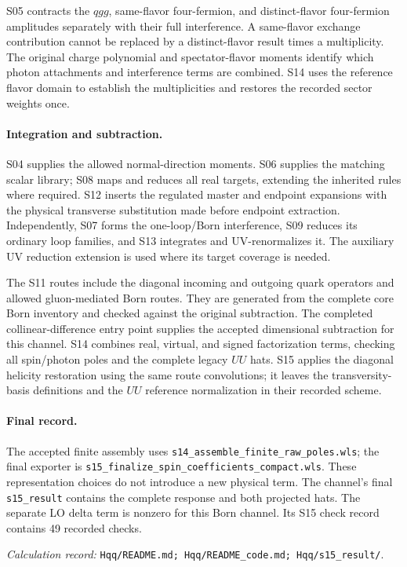 \documentclass[11pt,a4paper]{article}
\newcommand{\code}[1]{{\small\nolinkurl{#1}}}
\newcommand{\pathref}[1]{\par{\footnotesize\textit{Calculation record:} \code{#1}.}\par}
\begin{document}
S05 contracts the $qgg$, same-flavor four-fermion, and distinct-flavor four-fermion amplitudes separately with their full interference. A same-flavor exchange contribution cannot be replaced by a distinct-flavor result times a multiplicity. The original charge polynomial and spectator-flavor moments identify which photon attachments and interference terms are combined. S14 uses the reference flavor domain to establish the multiplicities and restores the recorded sector weights once.

\paragraph{Integration and subtraction.}
S04 supplies the allowed normal-direction moments. S06 supplies the matching scalar library; S08 maps and reduces all real targets, extending the inherited rules where required. S12 inserts the regulated master and endpoint expansions with the physical transverse substitution made before endpoint extraction. Independently, S07 forms the one-loop/Born interference, S09 reduces its ordinary loop families, and S13 integrates and UV-renormalizes it. The auxiliary UV reduction extension is used where its target coverage is needed.

The S11 routes include the diagonal incoming and outgoing quark operators and allowed gluon-mediated Born routes. They are generated from the complete core Born inventory and checked against the original subtraction. The completed collinear-difference entry point supplies the accepted dimensional subtraction for this channel. S14 combines real, virtual, and signed factorization terms, checking all spin/photon poles and the complete legacy $UU$ hats. S15 applies the diagonal helicity restoration using the same route convolutions; it leaves the transversity-basis definitions and the $UU$ reference normalization in their recorded scheme.

\paragraph{Final record.}
The accepted finite assembly uses \code{s14_assemble_finite_raw_poles.wls}; the final exporter is \code{s15_finalize_spin_coefficients_compact.wls}. These representation choices do not introduce a new physical term. The channel's final \code{s15_result} contains the complete response and both projected hats. The separate LO delta term is nonzero for this Born channel. Its S15 check record contains 49 recorded checks.
\pathref{Hqq/README.md; Hqq/README_code.md; Hqq/s15_result/}
\end{document}

